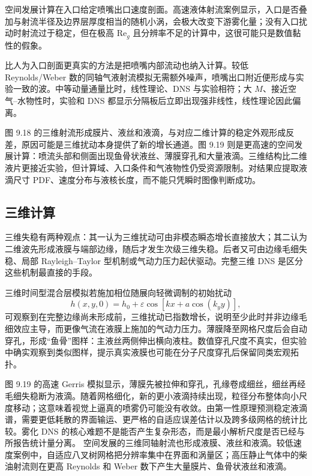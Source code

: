 \documentclass[11pt,a4paper,openany,fontset=none]{ctexbook}
\begin{document}
空间发展计算在入口给定喷嘴出口速度剖面。高速液体射流案例显示，入口是否叠加与射流半径及边界层厚度相当的随机小涡，会极大改变下游雾化量；没有入口扰动时射流过于稳定，但在极高 $\mathrm{Re}_g$ 且分辨率不足的计算中，这很可能只是数值黏性的假象。

比人为入口剖面更真实的方法是把喷嘴内部流动也纳入计算。较低 Reynolds/Weber 数的同轴气液射流模拟无需额外噪声，喷嘴出口附近便形成与实验一致的波。中等动量通量比时，线性理论、DNS 与实验相符；大 $M$、接近空气--水物性时，实验和 DNS 都显示分隔板后立即出现强非线性，线性理论因此偏离。

图 9.18 的三维射流形成膜片、液丝和液滴，与对应二维计算的稳定外观形成反差，原因可能是三维扰动本身提供了新的增长通道。图 9.19 则是更高速的空间发展计算：喷流头部和侧面出现鱼骨状液丝、薄膜穿孔和大量液滴。三维结构比二维液片更接近实验，但计算域、入口条件和气液物性仍受资源限制。对结果应提取液滴尺寸 PDF、速度分布与液核长度，而不能只凭瞬时图像判断成功。
\subsection{三维计算}

三维失稳有两种观点：其一认为三维扰动可由非模态瞬态增长直接放大；其二认为二维波先形成液膜与端部边缘，随后才发生次级三维失稳。后者又可由边缘毛细失稳、局部 Rayleigh--Taylor 型机制或气动力压力起伏驱动。完整三维 DNS 是区分这些机制最直接的手段。

三维时间型混合层模拟若施加相位随展向轻微调制的初始扰动
\begin{equation}
 h(x,y,0)=h_0+\varepsilon\cos[kx+a\cos(k_yy)],
\end{equation}
可观察到在完整边缘尚未形成前，三维扰动已指数增长，说明至少此时并非边缘毛细效应主导，而更像气流在液膜上施加的气动力压力。薄膜降至网格尺度后会自动穿孔，形成“鱼骨”图样：主液丝两侧伸出横向液柱。数值穿孔尺度不真实，但实验中确实观察到类似图样，提示真实液膜也可能在分子尺度穿孔后保留同类宏观拓扑。

图 9.19 的高速 Gerris 模拟显示，薄膜先被拉伸和穿孔，孔缘卷成细丝，细丝再经毛细失稳断为液滴。随着网格细化，新的更小液滴持续出现，粒径分布整体向小尺度移动；这意味着视觉上逼真的喷雾仍可能没有收敛。由第一性原理预测稳定液滴谱，需要更低耗散的界面输运、更严格的自适应误差估计以及跨多级网格的统计比较。雾化 DNS 的核心难题不是能否产生复杂形态，而是最小解析尺度是否已经与所报告统计量分离。
空间发展的三维同轴射流也形成液膜、液丝和液滴。较低速度案例中，自适应八叉树网格把分辨率集中在界面和涡量区；高压静止气体中的柴油射流则在更高 Reynolds 和 Weber 数下产生大量膜片、鱼骨状液丝和液滴。
\end{document}
